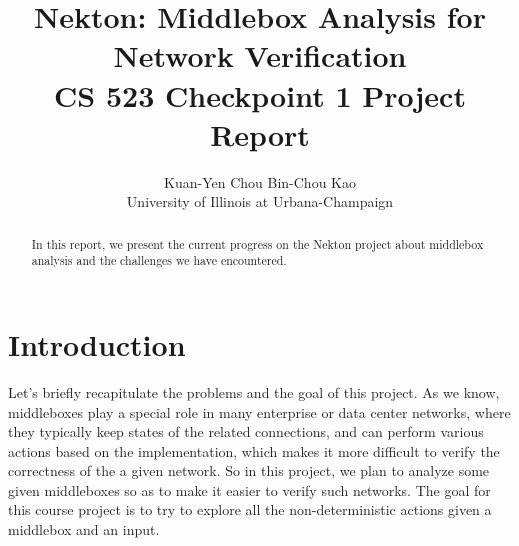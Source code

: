 \usepackage{filecontents}



\date{}

\title{\Large \bf Nekton: Middlebox Analysis for Network Verification\\
CS 523 Checkpoint 1 Project Report}

\author{
{\rm Kuan-Yen Chou}
\qquad
{\rm Bin-Chou Kao}\\
University of Illinois at Urbana-Champaign
} %

\maketitle

\begin{abstract}
In this report, we present the current progress on the Nekton project about
middlebox analysis and the challenges we have encountered.
\end{abstract}


\section{Introduction}

Let's briefly recapitulate the problems and the goal of this project. As we
know, middleboxes play a special role in many enterprise or data center
networks, where they typically keep states of the related connections, and can
perform various actions based on the implementation, which makes it more
difficult to verify the correctness of the a given network. So in this project,
we plan to analyze some given middleboxes so as to make it easier to verify such
networks. The goal for this course project is to try to explore all the
non-deterministic actions given a middlebox and an input.


